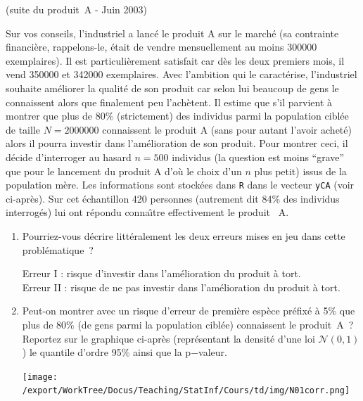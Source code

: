 \documentclass[10pt]{report}
\begin{document}
\begin{exercice} (suite du produit~A - Juin 2003)

Sur vos conseils, l'industriel a lanc{\'e} le produit A sur le march{\'e} (sa contrainte financi{\`e}re, rappelons-le, {\'e}tait de vendre mensuellement au moins 300000 exemplaires). Il est particuli{\`e}rement satisfait car d{\`e}s les deux premiers mois, il vend 350000 et 342000 exemplaires. Avec l'ambition qui le caract{\'e}rise, l'industriel souhaite am{\'e}liorer la qualit{\'e} de son produit car selon lui beaucoup de gens le connaissent alors que finalement peu l'ach{\`e}tent. Il estime que s'il parvient {\`a} montrer que plus de $80\%$ (strictement) des individus parmi la population cibl{\'e}e de taille $N=2000000$ connaissent le produit A (sans pour autant l'avoir achet{\'e}) alors il pourra investir dans l'am{\'e}lioration de son produit. Pour montrer ceci, il d{\'e}cide d'interroger au hasard $n=500$ individus (la question est moins ``grave'' que pour le lancement du produit A d'o{\`u} le choix d'un $n$ plus petit) issus de la population m{\`e}re. Les informations sont stock{\'e}es dans \texttt{R} dans le vecteur \texttt{yCA} (voir ci-apr{\`e}s). Sur cet {\'e}chantillon 420 personnes (autrement dit 84\% des individus interrog{\'e}s) lui ont r{\'e}pondu conna{\^\i}tre effectivement le produit~ A. \\
\begin{enumerate}
\item Pourriez-vous d{\'e}crire litt{\'e}ralement les deux erreurs mises en jeu dans cette probl{\'e}matique~? 


\begin{Correction}
Erreur I : risque d'investir dans l'amélioration du produit à tort. \\
Erreur II : risque de ne pas investir dans l'amélioration du produit à tort.
\end{Correction}


\item Peut-on montrer avec un risque d'erreur de premi{\`e}re esp{\`e}ce pr{\'e}fix{\'e} {\`a} 5\% que plus de 80\% (de gens parmi la population cibl{\'e}e) connaissent le produit~A~? Reportez sur le graphique ci-apr{\`e}s (repr{\'e}sentant la densit{\'e} d'une loi $\mathcal{N}(0,1)$) le quantile d'ordre 95\% ainsi que la p$-$valeur. 
 

\begin{center} 
\texttt{[image: /export/WorkTree/Docus/Teaching/StatInf/Cours/td/img/N01corr.png]}
\end{center}


\end{enumerate}
\end{exercice}
\end{document}
